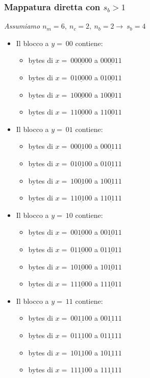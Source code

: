 \documentclass[12pt,a4paper]{article}
\begin{document}
\subsubsection{Mappatura diretta con $s_b > 1$}
\textsl{Assumiamo $n_m = 6,\ n_c = 2,\ n_b = 2 \rightarrow \ s_b = 4$}
\begin{itemize}
\item Il blocco a $y =\ 00$ contiene:
\begin{itemize}
\item bytes di $x =\ 00\underline{00}00$ a $00\underline{00}11$
\item bytes di $x =\ 01\underline{00}00$ a $01\underline{00}11$
\item bytes di $x =\ 10\underline{00}00$ a $10\underline{00}11$
\item bytes di $x =\ 11\underline{00}00$ a $11\underline{00}11$
\end{itemize}
\item Il blocco a $y =\ 01$ contiene:
\begin{itemize}
\item bytes di $x =\ 00\underline{01}00$ a $00\underline{01}11$
\item bytes di $x =\ 01\underline{01}00$ a $01\underline{01}11$
\item bytes di $x =\ 10\underline{01}00$ a $10\underline{01}11$
\item bytes di $x =\ 11\underline{01}00$ a $11\underline{01}11$
\end{itemize}
\item Il blocco a $y =\ 10$ contiene:
\begin{itemize}
\item bytes di $x =\ 00\underline{10}00$ a $00\underline{10}11$
\item bytes di $x =\ 01\underline{10}00$ a $01\underline{10}11$
\item bytes di $x =\ 10\underline{10}00$ a $10\underline{10}11$
\item bytes di $x =\ 11\underline{10}00$ a $11\underline{10}11$
\end{itemize}
\item Il blocco a $y =\ 11$ contiene:
\begin{itemize}
\item bytes di $x =\ 00\underline{11}00$ a $00\underline{11}11$
\item bytes di $x =\ 01\underline{11}00$ a $01\underline{11}11$
\item bytes di $x =\ 10\underline{11}00$ a $10\underline{11}11$
\item bytes di $x =\ 11\underline{11}00$ a $11\underline{11}11$
\end{itemize}
\end{itemize}
\end{document}
